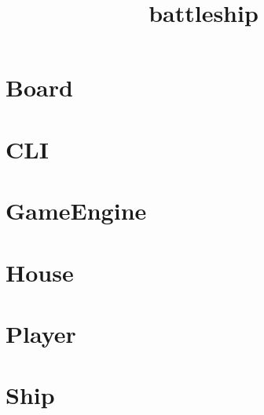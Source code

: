 \documentclass{article}
\begin{document}
\title{battleship}
\maketitle
\tableofcontents

\section{Board}

\section{CLI}

\section{GameEngine}

\section{House}

\section{Player}

\section{Ship}

\end{document}
